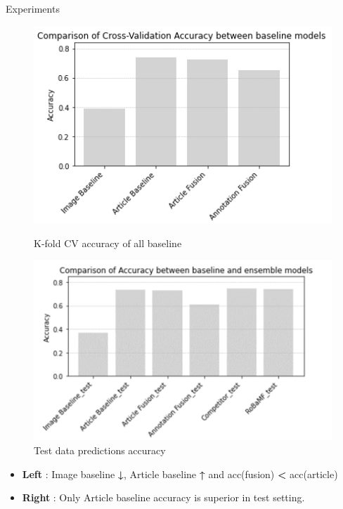 \documentclass[final]{beamer}
\newlength{\colwidth}
\begin{document}
\begin{frame}[t]
\begin{columns}[t]
\begin{column}{\colwidth}
\begin{block}{Experiments}
    \begin{figure}[ht]
        \centering
        \begin{minipage}{0.48\textwidth}
            \centering
            \includegraphics[width=15cm]{Figure/fig-CV-acc.png} %
            \caption{K-fold CV accuracy of all baseline}
            \label{fig.6}
        \end{minipage}\hfill
        \begin{minipage}{0.48\textwidth}
            \centering
            \includegraphics[width=15cm]{Figure/fig-test.png} %
            \caption{Test data predictions accuracy}
            \label{fig.7}
        \end{minipage}
    \end{figure}

    \begin{itemize}
        \item \textbf{Left} : Image baseline \textbf{↓}, Article baseline \textbf{↑} and acc(fusion) \textbf{<} acc(article)
        \item \textbf{Right} : Only Article baseline accuracy is superior in test setting.
    \end{itemize}


\end{block}
\end{column}
\end{columns}
\end{frame}
\end{document}
